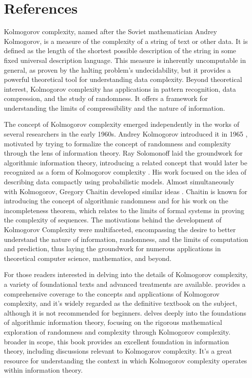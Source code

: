 \section*{References}

Kolmogorov complexity, named after the Soviet mathematician Andrey Kolmogorov, is a measure of the complexity of a string of text or other data. It is defined as the length of the shortest possible description of the string in some fixed universal description language. This measure is inherently uncomputable in general, as proven by the halting problem's undecidability, but it provides a powerful theoretical tool for understanding data complexity. Beyond theoretical interest, Kolmogorov complexity has applications in pattern recognition, data compression, and the study of randomness. It offers a framework for understanding the limits of compressibility and the nature of information.

The concept of Kolmogorov complexity emerged independently in the works of several researchers in the early 1960s. Andrey Kolmogorov introduced it in 1965 \cite{kolmogorov1965three}, motivated by trying to formalize the concept of randomness and complexity through the lens of information theory. Ray Solomonoff laid the groundwork for algorithmic information theory, introducing a related concept that would later be recognized as a form of Kolmogorov complexity \cite{solomonoff1964formal}. His work focused on the idea of describing data compactly using probabilistic models. Almost simultaneously with Kolmogorov, Gregory Chaitin developed similar ideas \cite{chaitin1969simplicity}. Chaitin is known for introducing the concept of algorithmic randomness and for his work on the incompleteness theorem, which relates to the limits of formal systems in proving the complexity of sequences. The motivations behind the development of Kolmogorov Complexity were multifaceted, encompassing the desire to better understand the nature of information, randomness, and the limits of computation and prediction, thus laying the groundwork for numerous applications in theoretical computer science, mathematics, and beyond.

For those readers interested in delving into the details of Kolmogorov complexity, a variety of foundational texts and advanced treatments are available. \cite{li2013introduction} provides a comprehensive coverage to the concepts and applications of Kolmogorov complexity, and it's widely regarded as the definitive textbook on the subject, although it is not recommended for beginners. \cite{calude2002information} delves deeply into the foundations of algorithmic information theory, focusing on the rigorous mathematical exploration of randomness and complexity through Kolmogorov complexity. \cite{cover2012elements} broader in scope, this book provides an excellent foundation in information theory, including discussions relevant to Kolmogorov complexity. It's a great resource for understanding the context in which Kolmogorov complexity operates within information theory.




